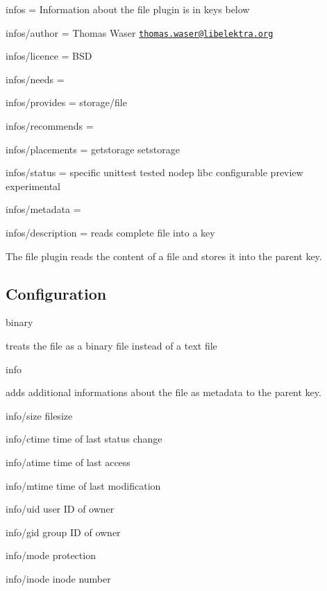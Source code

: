 
\begin{DoxyItemize}
\item infos = Information about the file plugin is in keys below
\item infos/author = Thomas Waser \href{mailto:thomas.waser@libelektra.org}{\tt thomas.\+waser@libelektra.\+org}
\item infos/licence = B\+SD
\item infos/needs =
\item infos/provides = storage/file
\item infos/recommends =
\item infos/placements = getstorage setstorage
\item infos/status = specific unittest tested nodep libc configurable preview experimental
\item infos/metadata =
\item infos/description = reads complete file into a key
\end{DoxyItemize}

The file plugin reads the content of a file and stores it into the parent key.

\subsection*{Configuration}


\begin{DoxyItemize}
\item {\ttfamily binary}

treats the file as a binary file instead of a text file
\item {\ttfamily info}

adds additional informations about the file as metadata to the parent key.
\begin{DoxyItemize}
\item {\ttfamily info/size} filesize
\item {\ttfamily info/ctime} time of last status change
\item {\ttfamily info/atime} time of last access
\item {\ttfamily info/mtime} time of last modification
\item {\ttfamily info/uid} user ID of owner
\item {\ttfamily info/gid} group ID of owner
\item {\ttfamily info/mode} protection
\item {\ttfamily info/inode} inode number
\end{DoxyItemize}
\end{DoxyItemize}

